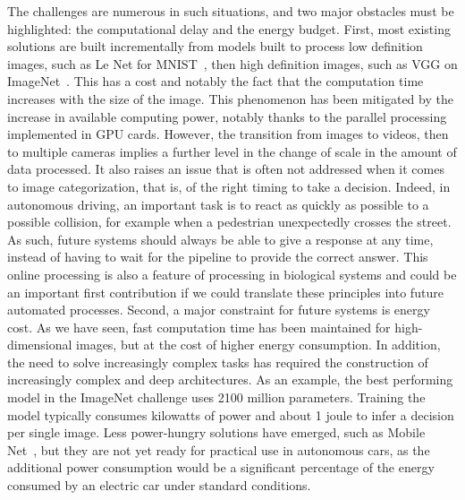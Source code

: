 \documentclass[default]{sn-jnl}%
\theoremstyle{thmstyleone}%
\theoremstyle{thmstyletwo}%
\theoremstyle{thmstylethree}%
\begin{document}
The challenges are numerous in such situations, and two major obstacles must be highlighted: the computational delay and the energy budget. First, most existing solutions are built incrementally from models built to process low definition images, such as Le Net for MNIST~\citep{lecun_gradient-based_1998}, then high definition images, such as VGG on ImageNet~\citep{simonyan_very_2015}. This has a cost and notably the fact that the computation time increases with the size of the image. This phenomenon has been mitigated by the increase in available computing power, notably thanks to the parallel processing implemented in GPU cards. However, the transition from images to videos, then to multiple cameras implies a further level in the change of scale in the amount of data processed. It also raises an issue that is often not addressed when it comes to image categorization, that is, of the right timing to take a decision. Indeed, in autonomous driving, an important task is to react as quickly as possible to a possible collision, for example when a pedestrian unexpectedly crosses the street. As such, future systems should always be able to give a response at any time, instead of having to wait for the pipeline to provide the correct answer. This online processing is also a feature of processing in biological systems and could be an important first contribution if we could translate these principles into future automated processes. %
Second, a major constraint for future systems is energy cost. As we have seen, fast computation time has been maintained for high-dimensional images, but at the cost of higher energy consumption. In addition, the need to solve increasingly complex tasks has required the construction of increasingly complex and deep architectures. As an example, the best performing model in the ImageNet challenge uses 2100 million parameters. Training the model typically consumes kilowatts of power and about 1 joule to infer a decision per single image. Less power-hungry solutions have emerged, such as Mobile Net~\citep{howard_searching_2019}, but they are not yet ready for practical use in autonomous cars, as the additional power consumption would be a significant percentage of the energy consumed by an electric car under standard conditions.
\end{document}
